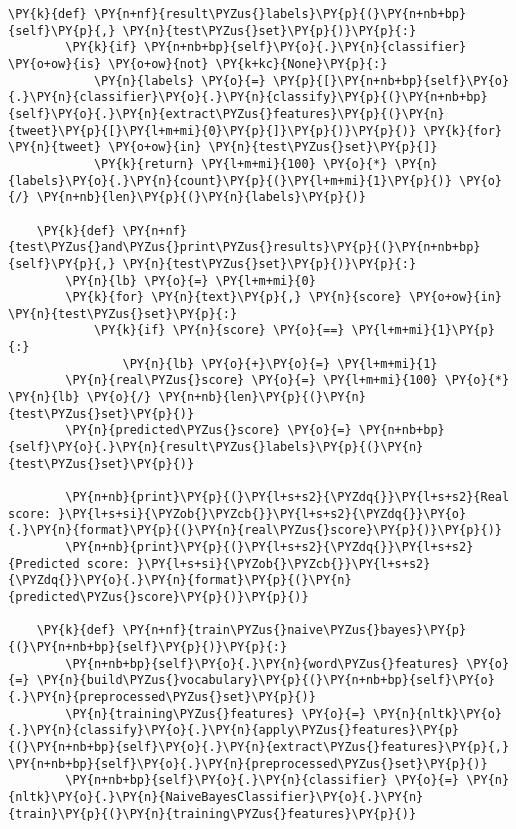 \begin{tcolorbox}[breakable, size=fbox, boxrule=1pt, pad at break*=1mm,colback=cellbackground, colframe=cellborder]
\begin{Verbatim}[commandchars=\\\{\}]
    \PY{k}{def} \PY{n+nf}{result\PYZus{}labels}\PY{p}{(}\PY{n+nb+bp}{self}\PY{p}{,} \PY{n}{test\PYZus{}set}\PY{p}{)}\PY{p}{:}
        \PY{k}{if} \PY{n+nb+bp}{self}\PY{o}{.}\PY{n}{classifier} \PY{o+ow}{is} \PY{o+ow}{not} \PY{k+kc}{None}\PY{p}{:}
            \PY{n}{labels} \PY{o}{=} \PY{p}{[}\PY{n+nb+bp}{self}\PY{o}{.}\PY{n}{classifier}\PY{o}{.}\PY{n}{classify}\PY{p}{(}\PY{n+nb+bp}{self}\PY{o}{.}\PY{n}{extract\PYZus{}features}\PY{p}{(}\PY{n}{tweet}\PY{p}{[}\PY{l+m+mi}{0}\PY{p}{]}\PY{p}{)}\PY{p}{)} \PY{k}{for} \PY{n}{tweet} \PY{o+ow}{in} \PY{n}{test\PYZus{}set}\PY{p}{]}
            \PY{k}{return} \PY{l+m+mi}{100} \PY{o}{*} \PY{n}{labels}\PY{o}{.}\PY{n}{count}\PY{p}{(}\PY{l+m+mi}{1}\PY{p}{)} \PY{o}{/} \PY{n+nb}{len}\PY{p}{(}\PY{n}{labels}\PY{p}{)}

    \PY{k}{def} \PY{n+nf}{test\PYZus{}and\PYZus{}print\PYZus{}results}\PY{p}{(}\PY{n+nb+bp}{self}\PY{p}{,} \PY{n}{test\PYZus{}set}\PY{p}{)}\PY{p}{:}
        \PY{n}{lb} \PY{o}{=} \PY{l+m+mi}{0}
        \PY{k}{for} \PY{n}{text}\PY{p}{,} \PY{n}{score} \PY{o+ow}{in} \PY{n}{test\PYZus{}set}\PY{p}{:}
            \PY{k}{if} \PY{n}{score} \PY{o}{==} \PY{l+m+mi}{1}\PY{p}{:}
                \PY{n}{lb} \PY{o}{+}\PY{o}{=} \PY{l+m+mi}{1}
        \PY{n}{real\PYZus{}score} \PY{o}{=} \PY{l+m+mi}{100} \PY{o}{*} \PY{n}{lb} \PY{o}{/} \PY{n+nb}{len}\PY{p}{(}\PY{n}{test\PYZus{}set}\PY{p}{)}
        \PY{n}{predicted\PYZus{}score} \PY{o}{=} \PY{n+nb+bp}{self}\PY{o}{.}\PY{n}{result\PYZus{}labels}\PY{p}{(}\PY{n}{test\PYZus{}set}\PY{p}{)}

        \PY{n+nb}{print}\PY{p}{(}\PY{l+s+s2}{\PYZdq{}}\PY{l+s+s2}{Real score: }\PY{l+s+si}{\PYZob{}\PYZcb{}}\PY{l+s+s2}{\PYZdq{}}\PY{o}{.}\PY{n}{format}\PY{p}{(}\PY{n}{real\PYZus{}score}\PY{p}{)}\PY{p}{)}
        \PY{n+nb}{print}\PY{p}{(}\PY{l+s+s2}{\PYZdq{}}\PY{l+s+s2}{Predicted score: }\PY{l+s+si}{\PYZob{}\PYZcb{}}\PY{l+s+s2}{\PYZdq{}}\PY{o}{.}\PY{n}{format}\PY{p}{(}\PY{n}{predicted\PYZus{}score}\PY{p}{)}\PY{p}{)}

    \PY{k}{def} \PY{n+nf}{train\PYZus{}naive\PYZus{}bayes}\PY{p}{(}\PY{n+nb+bp}{self}\PY{p}{)}\PY{p}{:}
        \PY{n+nb+bp}{self}\PY{o}{.}\PY{n}{word\PYZus{}features} \PY{o}{=} \PY{n}{build\PYZus{}vocabulary}\PY{p}{(}\PY{n+nb+bp}{self}\PY{o}{.}\PY{n}{preprocessed\PYZus{}set}\PY{p}{)}
        \PY{n}{training\PYZus{}features} \PY{o}{=} \PY{n}{nltk}\PY{o}{.}\PY{n}{classify}\PY{o}{.}\PY{n}{apply\PYZus{}features}\PY{p}{(}\PY{n+nb+bp}{self}\PY{o}{.}\PY{n}{extract\PYZus{}features}\PY{p}{,} \PY{n+nb+bp}{self}\PY{o}{.}\PY{n}{preprocessed\PYZus{}set}\PY{p}{)}
        \PY{n+nb+bp}{self}\PY{o}{.}\PY{n}{classifier} \PY{o}{=} \PY{n}{nltk}\PY{o}{.}\PY{n}{NaiveBayesClassifier}\PY{o}{.}\PY{n}{train}\PY{p}{(}\PY{n}{training\PYZus{}features}\PY{p}{)}
\end{Verbatim}
\end{tcolorbox}

